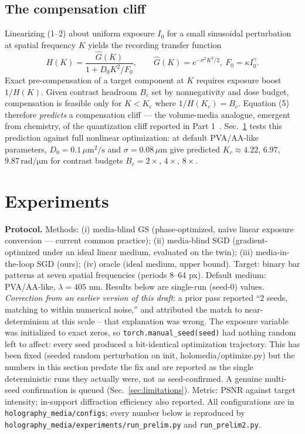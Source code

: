 \documentclass[conference]{IEEEtran}
\begin{document}
\subsection{The compensation cliff}
\label{sec:cliff}
Linearizing (1--2) about uniform exposure $I_0$ for a small sinusoidal
perturbation at spatial frequency $K$ yields the recording transfer function
\begin{equation}
H(K) = \frac{\hat G(K)}{1 + D_0 K^2/F_0}, \qquad \hat G(K) = e^{-\sigma^2K^2/2},\ F_0 = \kappa I_0^\gamma. \label{eq:transfer}
\end{equation}
Exact pre-compensation of a target component at $K$ requires exposure boost
$1/H(K)$. Given contrast headroom $B_c$ set by nonnegativity and dose budget,
compensation is feasible only for $K < K_c$ where $1/H(K_c) = B_c$. Equation
(5) therefore \emph{predicts} a compensation cliff — the volume-media
analogue, emergent from chemistry, of the quantization cliff reported in
Part 1~\cite{tripathi2025holoforge}. Sec.~\ref{sec:experiments} tests this
prediction against full nonlinear optimization: at default PVA/AA-like
parameters, $D_0 = 0.1\,\mu\mathrm{m}^2/\mathrm{s}$ and $\sigma = 0.08\,\mu$m
give predicted $K_c \approx 4.22$, $6.97$, $9.87\,\mathrm{rad/\mu m}$ for
contrast budgets $B_c = 2\times$, $4\times$, $8\times$.

\section{Experiments}
\label{sec:experiments}

\textbf{Protocol.} Methods: (i) media-blind GS (phase-optimized, naive linear
exposure conversion — current common practice); (ii) media-blind SGD
(gradient-optimized under an ideal linear medium, evaluated on the twin);
(iii) media-in-the-loop SGD (ours); (iv) oracle (ideal medium, upper bound).
Target: binary bar patterns at seven spatial frequencies (periods 8--64 px).
Default medium: PVA/AA-like, $\lambda = 405$ nm. Results below are single-run
(seed-0) values. \emph{Correction from an earlier version of this draft}: a
prior pass reported ``2 seeds, matching to within numerical noise,'' and
attributed the match to near-determinism at this scale -- that explanation
was wrong. The exposure variable was initialized to exact zeros, so
\texttt{torch.manual\_seed(seed)} had nothing random left to affect: every
seed produced a bit-identical optimization trajectory. This has been fixed
(seeded random perturbation on init, holomedia/optimize.py) but the numbers
in this section predate the fix and are reported as the single deterministic
runs they actually were, not as seed-confirmed. A genuine multi-seed
confirmation is queued (Sec.~\ref{sec:limitations}). Metric: PSNR against
target intensity; in-support diffraction efficiency also reported. All
configurations are in \texttt{holography\_media/configs}; every number below
is reproduced by \texttt{holography\_media/experiments/run\_prelim.py} and
\texttt{run\_prelim2.py}.
\end{document}
